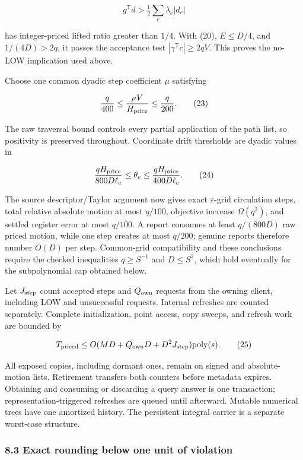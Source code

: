 \[
g^{\mathsf T}d>\tfrac12\sum_e\lambda_e|d_e|
 \tag{22}
\]

has integer-priced lifted ratio greater than \(1/4\). With (20), \(E\leq D/4\), and \(1/(4D)>2q\), it passes the acceptance test \(|\gamma^{\mathsf T}c|\geq2qV\). This proves the no-LOW implication used above.

Choose one common dyadic step coefficient \(\mu\) satisfying

\[
\frac q{400}\leq\frac{\mu V}{H_{\rm price}}\leq\frac q{200}.
 \tag{23}
\]

The raw traversal bound controls every partial application of the path list, so positivity is preserved throughout. Coordinate drift thresholds are dyadic values in

\[
\frac{qH_{\rm price}}{800D\ell_e}
 \leq\theta_e\leq
 \frac{qH_{\rm price}}{400D\ell_e}.
 \tag{24}
\]

The source descriptor/Taylor argument now gives exact \(\varepsilon\)-grid circulation steps, total relative absolute motion at most \(q/100\), objective increase \(\Omega(q^2)\), and settled register error at most \(q/100\). A report consumes at least \(q/(800D)\) raw priced motion, while one step creates at most \(q/200\); genuine reports therefore number \(O(D)\) per step. Common-grid compatibility and these conclusions require the checked inequalities \(q\geq S^{-1}\) and \(D\leq S^2\), which hold eventually for the subpolynomial cap obtained below.

Let \(J_{\rm step}\) count accepted steps and \(Q_{\rm own}\) requests from the owning client, including LOW and unsuccessful requests. Internal refreshes are counted separately. Complete initialization, point access, copy sweeps, and refresh work are bounded by

\[
T_{\rm priced}
 \leq O(MD+Q_{\rm own}D+D^2J_{\rm step})
                                      \mathrm{poly}(s).
 \tag{25}
\]

All exposed copies, including dormant ones, remain on signed and absolute-motion lists. Retirement transfers both counters before metadata expires. Obtaining and consuming or discarding a query answer is one transaction; representation-triggered refreshes are queued until afterward. Mutable numerical trees have one amortized history. The persistent integral carrier is a separate worst-case structure.

\hypertarget{af-46593eb93e-exact-rounding-below-one-unit-of-violation}{%
\subsubsection{8.3 Exact rounding below one unit of violation}\label{af-46593eb93e-exact-rounding-below-one-unit-of-violation}}

